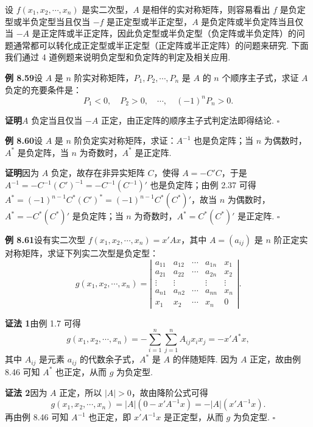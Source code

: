 \documentclass[UTF8,12pt,a4paper,fontset=fandol]{ctexart}
\begin{document}
设 $f(x_1,x_2,\cdots,x_n)$ 是实二次型，$A$ 是相伴的实对称矩阵，则容易看出 $f$ 是负定型或半负定型当且仅当 $-f$ 是正定型或半正定型，$A$ 是负定阵或半负定阵当且仅当 $-A$ 是正定阵或半正定阵，因此负定型或半负定型（负定阵或半负定阵）的问题通常都可以转化成正定型或半正定型（正定阵或半正定阵）的问题来研究. 下面我们通过 4 道例题来说明负定型和负定阵的判定及相关应用.

\noindent\textbf{例 8.59}\quad 设 $A$ 是 $n$ 阶实对称矩阵，$P_1,P_2,\cdots,P_n$ 是 $A$ 的 $n$ 个顺序主子式，求证 $A$ 负定的充要条件是：
\[
P_1<0,\quad P_2>0,\quad \cdots,\quad (-1)^nP_n>0.
\]

\noindent\textbf{证明}\quad $A$ 负定当且仅当 $-A$ 正定，由正定阵的顺序主子式判定法即得结论. $\ensuremath{\square}$

\noindent\textbf{例 8.60}\quad 设 $A$ 是 $n$ 阶负定实对称矩阵，求证：$A^{-1}$ 也是负定阵；当 $n$ 为偶数时，$A^*$ 是负定阵，当 $n$ 为奇数时，$A^*$ 是正定阵.

\noindent\textbf{证明}\quad 因为 $A$ 负定，故存在非异实矩阵 $C$，使得 $A=-C'C$，于是 $A^{-1}=-C^{-1}(C')^{-1}=-C^{-1}(C^{-1})'$ 也是负定阵；由例 2.37 可得 $A^*=(-1)^{n-1}C^*(C')^*=(-1)^{n-1}C^*(C^*)'$，故当 $n$ 为偶数时，$A^*=-C^*(C^*)'$ 是负定阵；当 $n$ 为奇数时，$A^*=C^*(C^*)'$ 是正定阵. $\ensuremath{\square}$

\noindent\textbf{例 8.61}\quad 设有实二次型 $f(x_1,x_2,\cdots,x_n)=x'Ax$，其中 $A=(a_{ij})$ 是 $n$ 阶正定实对称矩阵，求证下列实二次型是负定型：
\[
g(x_1,x_2,\cdots,x_n)=
\left|\begin{array}{ccccc}
a_{11} & a_{12} & \cdots & a_{1n} & x_1\\
a_{21} & a_{22} & \cdots & a_{2n} & x_2\\
\vdots & \vdots &        & \vdots & \vdots\\
a_{n1} & a_{n2} & \cdots & a_{nn} & x_n\\
x_1 & x_2 & \cdots & x_n & 0
\end{array}\right|.
\]

\noindent\textbf{证法 1}\quad 由例 1.7 可得
\[
g(x_1,x_2,\cdots,x_n)=-\sum_{i=1}^n\sum_{j=1}^n A_{ij}x_ix_j=-x'A^*x,
\]
其中 $A_{ij}$ 是元素 $a_{ij}$ 的代数余子式，$A^*$ 是 $A$ 的伴随矩阵. 因为 $A$ 正定，故由例 8.46 可知 $A^*$ 也正定，从而 $g$ 为负定型.

\noindent\textbf{证法 2}\quad 因为 $A$ 正定，所以 $|A|>0$，故由降阶公式可得
\[
g(x_1,x_2,\cdots,x_n)=|A|(0-x'A^{-1}x)=-|A|(x'A^{-1}x).
\]
再由例 8.46 可知 $A^{-1}$ 也正定，即 $x'A^{-1}x$ 是正定型，从而 $g$ 为负定型. $\ensuremath{\square}$
\end{document}
